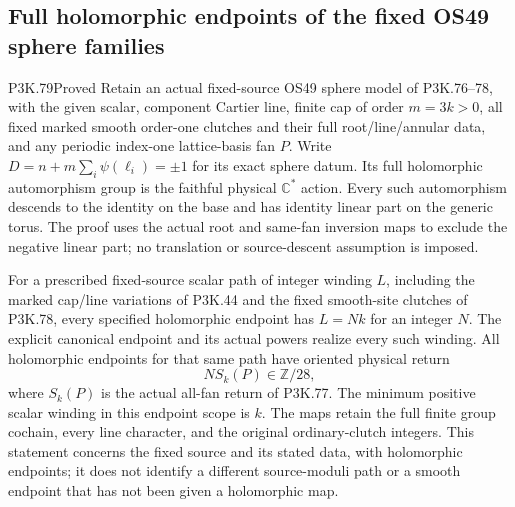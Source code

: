 \subsection{Full holomorphic endpoints of the fixed OS49 sphere families}
\begin{statement}{P3K.79}{Proved}
Retain an actual fixed-source OS49 sphere model of P3K.76--78,
with the given scalar, component Cartier line, finite cap of order
\(m=3k>0\), all fixed marked smooth order-one clutches and their full
root/line/annular data, and any periodic index-one lattice-basis fan \(P\).
Write \(D=n+m\sum_i\psi(\ell_i)=\pm1\) for its exact sphere datum.
Its full holomorphic automorphism group is the faithful physical
\(\mathbb C^*\) action. Every such automorphism descends to the identity
on the base and has identity linear part on the generic torus. The proof
uses the actual root and same-fan inversion maps to exclude the negative
linear part; no translation or source-descent assumption is imposed.

For a prescribed fixed-source scalar path of integer winding \(L\),
including the marked cap/line variations of P3K.44 and the fixed
smooth-site clutches of P3K.78, every specified holomorphic endpoint has
\(L=Nk\) for an integer \(N\). The explicit canonical endpoint and its
actual powers realize every such winding. All holomorphic endpoints for
that same path have oriented physical return
\[
                              N S_k(P)\in\mathbb Z/28,
\]
where \(S_k(P)\) is the actual all-fan return of P3K.77. The minimum
positive scalar winding in this endpoint scope is \(k\).
The maps retain the full finite group cochain, every line character,
and the original ordinary-clutch integers. This statement concerns the
fixed source and its stated data, with holomorphic endpoints; it does
not identify a different source-moduli path or a smooth endpoint that
has not been given a holomorphic map.
\end{statement}
